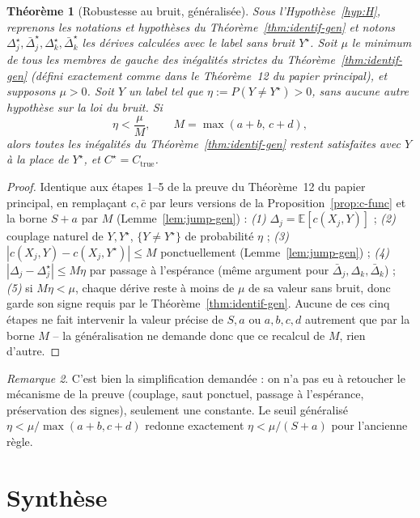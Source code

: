 \documentclass[12pt,a4paper]{article}
\newtheorem{theorem}{Théorème}[section]
\theoremstyle{remark}
\newtheorem{remark}[theorem]{Remarque}
\begin{document}
\begin{theorem}[Robustesse au bruit, généralisée]\label{thm:bruit-gen}
Sous l'Hypothèse~\ref{hyp:H}, reprenons les notations et hypothèses du
Théorème~\ref{thm:identif-gen} et notons
$\Delta_j^\star,\bar\Delta_j^\star,\Delta_k^\star,\bar\Delta_k^\star$ les
dérives calculées avec le label sans bruit $Y^\star$. Soit $\mu$ le minimum
de tous les membres de gauche des inégalités strictes du
Théorème~\ref{thm:identif-gen} (défini exactement comme dans le Théorème~12
du papier principal), et supposons $\mu>0$. Soit $Y$ un label tel que
$\eta:=P(Y\ne Y^\star)>0$, sans aucune autre hypothèse sur la loi du bruit.
Si
\[
  \boxed{\eta < \frac{\mu}{M}, \qquad M=\max(a+b,\,c+d),}
\]
alors toutes les inégalités du Théorème~\ref{thm:identif-gen} restent
satisfaites avec $Y$ à la place de $Y^\star$, et $C^\star=C_{\mathrm{true}}$.
\end{theorem}

\begin{proof}
Identique aux étapes 1--5 de la preuve du Théorème~12 du papier principal,
en remplaçant $c,\bar c$ par leurs versions de la Proposition~\ref{prop:c-func}
et la borne $S+a$ par $M$ (Lemme~\ref{lem:jump-gen}) :
\emph{(1)} $\Delta_j=\mathbb E[c(X_j,Y)]$ ;
\emph{(2)} couplage naturel de $Y,Y^\star$, $\{Y\ne Y^\star\}$ de probabilité $\eta$ ;
\emph{(3)} $|c(X_j,Y)-c(X_j,Y^\star)|\le M$ ponctuellement (Lemme~\ref{lem:jump-gen}) ;
\emph{(4)} $|\Delta_j-\Delta_j^\star|\le M\eta$ par passage à l'espérance (même
argument pour $\bar\Delta_j,\Delta_k,\bar\Delta_k$) ;
\emph{(5)} si $M\eta<\mu$, chaque dérive reste à moins de $\mu$ de sa valeur
sans bruit, donc garde son signe requis par le Théorème~\ref{thm:identif-gen}.
Aucune de ces cinq étapes ne fait intervenir la valeur précise de $S,a$ ou
$a,b,c,d$ autrement que par la borne $M$ -- la généralisation ne demande donc
que ce recalcul de $M$, rien d'autre.
\end{proof}

\begin{remark}
C'est bien la simplification demandée : on n'a pas eu à retoucher le
mécanisme de la preuve (couplage, saut ponctuel, passage à l'espérance,
préservation des signes), seulement une constante. Le seuil généralisé
$\eta<\mu/\max(a+b,c+d)$ redonne exactement $\eta<\mu/(S+a)$ pour l'ancienne
règle.
\end{remark}

\section{Synthèse}
\end{document}
